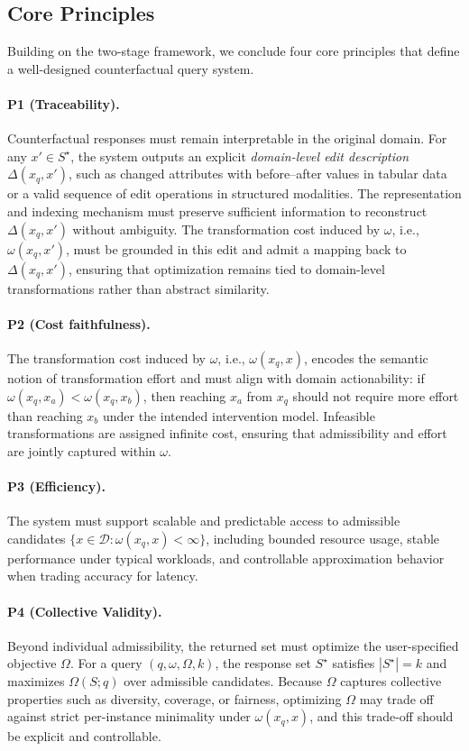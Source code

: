 
\subsection{Core Principles}\label{sec:core_principles}
Building on the two-stage framework, we conclude four core principles that define a well-designed counterfactual query system.

\paragraph{\textbf{P1 (Traceability).}} Counterfactual responses must remain interpretable in the original domain. For any $x' \in S^\star$, the system outputs an explicit \emph{domain-level edit description} $\Delta(x_q,x')$, such as changed attributes with before--after values in tabular data or a valid sequence of edit operations in structured modalities. The representation and indexing mechanism must preserve sufficient information to reconstruct $\Delta(x_q,x')$ without ambiguity. The transformation cost induced by $\omega$, i.e., $\omega(x_q,x')$, must be grounded in this edit and admit a mapping back to $\Delta(x_q,x')$, ensuring that optimization remains tied to domain-level transformations rather than abstract similarity.
\paragraph{\textbf{P2 (Cost faithfulness).}} The transformation cost induced by $\omega$, i.e., $\omega(x_q,x)$, encodes the semantic notion of transformation effort and must align with domain actionability: if $\omega(x_q,x_a) < \omega(x_q,x_b)$, then reaching $x_a$ from $x_q$ should not require more effort than reaching $x_b$ under the intended intervention model. Infeasible transformations are assigned infinite cost, ensuring that admissibility and effort are jointly captured within $\omega$.
\paragraph{\textbf{P3 (Efficiency).}} The system must support scalable and predictable access to admissible candidates $\{x \in \mathcal D : \omega(x_q,x) < \infty\}$, including bounded resource usage, stable performance under typical workloads, and controllable approximation behavior when trading accuracy for latency.
\paragraph{\textbf{P4 (Collective Validity).}} Beyond individual admissibility, the returned set must optimize the user-specified objective $\Omega$. For a query $(q,\omega,\Omega,k)$, the response set $S^\star$ satisfies $|S^\star|=k$ and maximizes $\Omega(S;q)$ over admissible candidates. Because $\Omega$ captures collective properties such as diversity, coverage, or fairness, optimizing $\Omega$ may trade off against strict per-instance minimality under $\omega(x_q,x)$, and this trade-off should be explicit and controllable.

